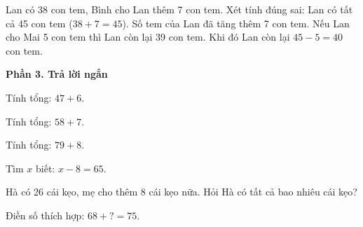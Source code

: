 \begin{ex} %
Lan có 38 con tem, Bình cho Lan thêm 7 con tem. Xét tính đúng sai:
\choiceTF
{\True Lan có tất cả 45 con tem ($38 + 7 = 45$).}
{\True Số tem của Lan đã tăng thêm 7 con tem.}
{Nếu Lan cho Mai 5 con tem thì Lan còn lại 39 con tem.}
{\True Khi đó Lan còn lại $45 - 5 = 40$ con tem.}
\end{ex}

\textbf{Phần 3. Trả lời ngắn}

\begin{ex} %
Tính tổng: $47 + 6$.
\end{ex}

\begin{ex} %
Tính tổng: $58 + 7$.
\end{ex}

\begin{ex} %
Tính tổng: $79 + 8$.
\end{ex}

\begin{ex} %
Tìm $x$ biết: $x - 8 = 65$.
\end{ex}

\begin{ex} %
Hà có 26 cái kẹo, mẹ cho thêm 8 cái kẹo nữa. Hỏi Hà có tất cả bao nhiêu cái kẹo?
\end{ex}

\begin{ex} %
Điền số thích hợp: $68 + ? = 75$.
\end{ex}
